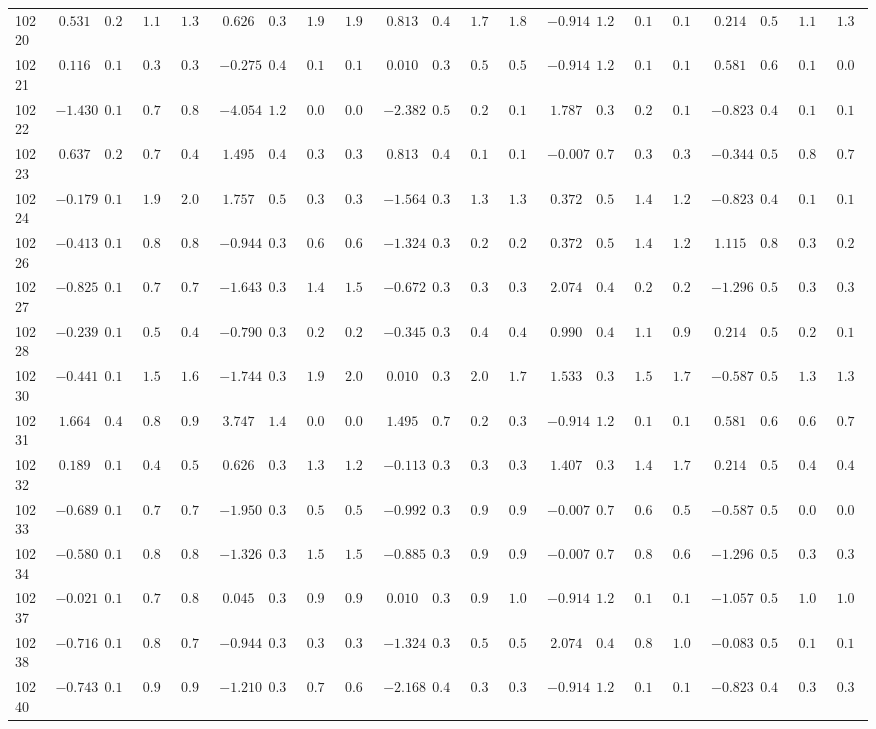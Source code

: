 \begin{landscape}
{\begin{longtable}{l|rrrr|rrrr|rrrr|rrrr|rrrr}
10220&$ 0.531$&$0.227$&$1.140$&$1.367$&$ 0.626$&$0.393$&$1.926$&$1.943$&$ 0.813$&$0.497$&$1.707$&$1.863$&$-0.914$&$1.254$&$0.135$&$0.149$&$ 0.214$&$0.594$&$1.183$&$1.322$\tabularnewline
10221&$ 0.116$&$0.190$&$0.353$&$0.320$&$-0.275$&$0.402$&$0.110$&$0.109$&$ 0.010$&$0.363$&$0.579$&$0.523$&$-0.914$&$1.254$&$0.135$&$0.149$&$ 0.581$&$0.677$&$0.154$&$0.093$\tabularnewline
10222&$-1.430$&$0.190$&$0.779$&$0.811$&$-4.054$&$1.200$&$0.092$&$0.099$&$-2.382$&$0.505$&$0.215$&$0.148$&$ 1.787$&$0.385$&$0.258$&$0.195$&$-0.823$&$0.499$&$0.101$&$0.100$\tabularnewline
10223&$ 0.637$&$0.240$&$0.738$&$0.466$&$ 1.495$&$0.495$&$0.346$&$0.303$&$ 0.813$&$0.497$&$0.164$&$0.108$&$-0.007$&$0.714$&$0.316$&$0.348$&$-0.344$&$0.520$&$0.845$&$0.793$\tabularnewline
10224&$-0.179$&$0.176$&$1.965$&$2.040$&$ 1.757$&$0.553$&$0.376$&$0.354$&$-1.564$&$0.364$&$1.337$&$1.314$&$ 0.372$&$0.563$&$1.401$&$1.249$&$-0.823$&$0.499$&$0.101$&$0.100$\tabularnewline
10226&$-0.413$&$0.169$&$0.841$&$0.835$&$-0.944$&$0.376$&$0.610$&$0.685$&$-1.324$&$0.346$&$0.251$&$0.256$&$ 0.372$&$0.563$&$1.401$&$1.249$&$ 1.115$&$0.851$&$0.303$&$0.292$\tabularnewline
10227&$-0.825$&$0.167$&$0.743$&$0.729$&$-1.643$&$0.331$&$1.498$&$1.501$&$-0.672$&$0.332$&$0.324$&$0.321$&$ 2.074$&$0.423$&$0.205$&$0.235$&$-1.296$&$0.509$&$0.326$&$0.334$\tabularnewline
10228&$-0.239$&$0.174$&$0.522$&$0.406$&$-0.790$&$0.389$&$0.275$&$0.279$&$-0.345$&$0.341$&$0.448$&$0.464$&$ 0.990$&$0.414$&$1.138$&$0.983$&$ 0.214$&$0.594$&$0.256$&$0.188$\tabularnewline
10230&$-0.441$&$0.169$&$1.544$&$1.607$&$-1.744$&$0.331$&$1.999$&$2.063$&$ 0.010$&$0.363$&$2.000$&$1.786$&$ 1.533$&$0.373$&$1.534$&$1.752$&$-0.587$&$0.505$&$1.301$&$1.300$\tabularnewline
10231&$ 1.664$&$0.476$&$0.874$&$0.975$&$ 3.747$&$1.435$&$0.083$&$0.086$&$ 1.495$&$0.741$&$0.273$&$0.309$&$-0.914$&$1.254$&$0.135$&$0.149$&$ 0.581$&$0.677$&$0.678$&$0.730$\tabularnewline
10232&$ 0.189$&$0.195$&$0.477$&$0.528$&$ 0.626$&$0.393$&$1.330$&$1.273$&$-0.113$&$0.354$&$0.313$&$0.345$&$ 1.407$&$0.376$&$1.445$&$1.785$&$ 0.214$&$0.594$&$0.498$&$0.462$\tabularnewline
10233&$-0.689$&$0.166$&$0.712$&$0.715$&$-1.950$&$0.341$&$0.518$&$0.527$&$-0.992$&$0.333$&$0.935$&$0.941$&$-0.007$&$0.714$&$0.602$&$0.575$&$-0.587$&$0.505$&$0.042$&$0.043$\tabularnewline
10234&$-0.580$&$0.167$&$0.808$&$0.818$&$-1.326$&$0.343$&$1.571$&$1.543$&$-0.885$&$0.332$&$0.978$&$0.983$&$-0.007$&$0.714$&$0.866$&$0.660$&$-1.296$&$0.509$&$0.326$&$0.334$\tabularnewline
10237&$-0.021$&$0.182$&$0.792$&$0.859$&$ 0.045$&$0.393$&$0.988$&$0.961$&$ 0.010$&$0.363$&$0.999$&$1.060$&$-0.914$&$1.254$&$0.135$&$0.149$&$-1.057$&$0.501$&$1.059$&$1.029$\tabularnewline
10238&$-0.716$&$0.166$&$0.825$&$0.771$&$-0.944$&$0.376$&$0.330$&$0.302$&$-1.324$&$0.346$&$0.586$&$0.541$&$ 2.074$&$0.423$&$0.873$&$1.001$&$-0.083$&$0.547$&$0.104$&$0.101$\tabularnewline
10240&$-0.743$&$0.166$&$0.948$&$0.943$&$-1.210$&$0.352$&$0.707$&$0.686$&$-2.168$&$0.453$&$0.379$&$0.357$&$-0.914$&$1.254$&$0.135$&$0.149$&$-0.823$&$0.499$&$0.391$&$0.391$\tabularnewline
\hline
\end{longtable}}\end{landscape}


